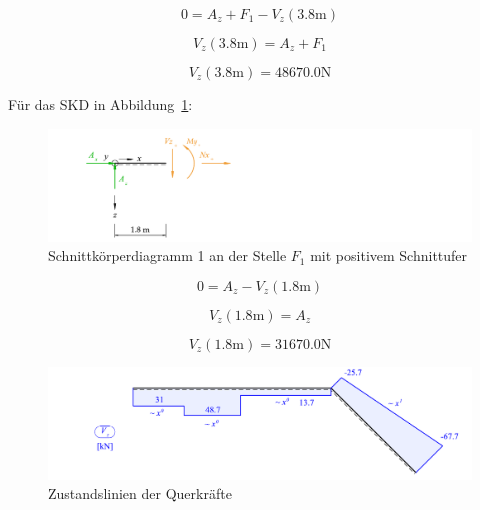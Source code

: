 \documentclass[
  12pt,
  letterpaper,
  DIV=11,
  egregdoesnotlikesansseriftitles]{scrartcl}
\begin{document}
\begin{equation}0 = A_{z} + F_{1} - V_{z}{\left(3.8 \text{m} \right)}\end{equation}

\begin{equation}V_{z}{\left(3.8 \text{m} \right)} = A_{z} + F_{1}\end{equation}

\begin{equation}V_{z}{\left(3.8 \text{m} \right)} = 48670.0 \text{N}\end{equation}

Für das SKD in Abbildung~\ref{fig-skd_1}:

\begin{figure}[H]

{\centering \includegraphics{BSI_HS23_Testat_02_files/mediabag/../images/Testat_02_HS23_SKD_1.pdf}

}

\caption{\label{fig-skd_1}Schnittkörperdiagramm 1 an der Stelle \(F_1\)
mit positivem Schnittufer}

\end{figure}

\begin{equation}0 = A_{z} - V_{z}{\left(1.8 \text{m} \right)}\end{equation}

\begin{equation}V_{z}{\left(1.8 \text{m} \right)} = A_{z}\end{equation}

\begin{equation}V_{z}{\left(1.8 \text{m} \right)} = 31670.0 \text{N}\end{equation}

\begin{figure}[H]

{\centering \includegraphics{BSI_HS23_Testat_02_files/mediabag/../images/Testat_02_HS23_Vz.pdf}

}

\caption{\label{fig-vz}Zustandslinien der Querkräfte}

\end{figure}
\end{document}
